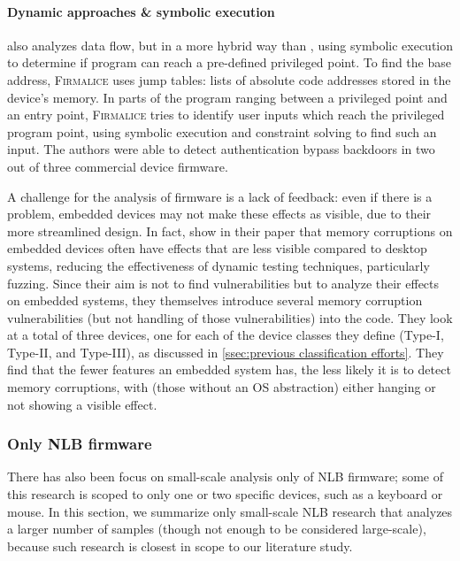 \paragraph{Dynamic approaches \& symbolic execution}
 also analyzes data flow, but in a more hybrid way than , using symbolic execution to determine if program can reach a pre-defined privileged point.
To find the base address, \textsc{Firmalice} uses jump tables: lists of absolute code addresses stored in the device's memory.
In parts of the program ranging between a privileged point and an entry point, \textsc{Firmalice} tries to identify user inputs which reach the privileged program point, using symbolic execution and constraint solving to find such an input.
The authors were able to detect authentication bypass backdoors in two out of three commercial device firmware.

A challenge for the analysis of  firmware is a lack of feedback: even if there is a problem, embedded devices may not make these effects as visible, due to their more streamlined design.
In fact,  show in their paper that memory corruptions on embedded devices often have effects that are less visible compared to desktop systems, reducing the effectiveness of dynamic testing techniques, particularly fuzzing.
Since their aim is not to find vulnerabilities but to analyze their effects on embedded systems, they themselves introduce several memory corruption vulnerabilities (but not handling of those vulnerabilities) into the code.
They look at a total of three devices, one for each of the device classes they define (Type-I, Type-II, and Type-III), as discussed in \autoref{ssec:previous classification efforts}.
They find that the fewer features an embedded system has, the less likely it is to detect memory corruptions, with  (those without an OS abstraction) either hanging or not showing a visible effect.

\subsubsection{Only NLB firmware}
There has also been focus on small-scale analysis only of NLB firmware; some of this research is scoped to only one or two specific devices, such as a keyboard or mouse.
In this section, we summarize only small-scale NLB research that analyzes a larger number of samples (though not enough to be considered large-scale), because such research is closest in scope to our literature study.

